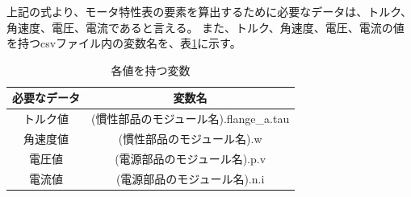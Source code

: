 上記の式より、モータ特性表の要素を算出するために必要なデータは、トルク、角速度、電圧、電流であると言える。
また、トルク、角速度、電圧、電流の値を持つcsvファイル内の変数名を、表\ref{tab:hensuu}に示す。　
\begin{table}[t]
	\centering
	\caption{各値を持つ変数}
	\begin{tabular}{|c|c|} \hline
	  必要なデータ & 変数名 \\ \hline \hline
	  トルク値 & (慣性部品のモジュール名).flange\_a.tau \\ \hline
	  角速度値 &  (慣性部品のモジュール名).w \\ \hline
	  電圧値 &  (電源部品のモジュール名).p.v \\ \hline
	  電流値 &  (電源部品のモジュール名).n.i \\ \hline
	\end{tabular}
	\label{tab:hensuu}
  \end{table}

